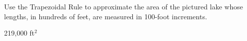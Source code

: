 {Use the Trapezoidal Rule to approximate the area of the pictured lake whose lengths, in hundreds of feet, are measured in 100-foot increments.\label{07_01_ex_29_1}

\begin{center}\end{center}}
{219,000 ft$^2$}
